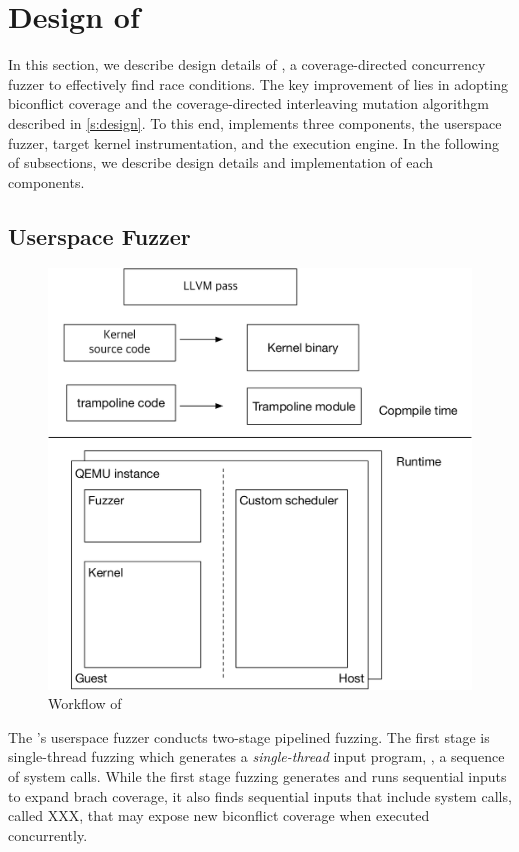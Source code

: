 \section{Design of \sys}
\label{s:impl}


In this section, we describe design details of \sys, a
coverage-directed concurrency fuzzer to effectively find race
conditions.
%
The key improvement of \sys lies in adopting biconflict coverage and
the coverage-directed interleaving mutation algorithgm described in
\autoref{s:design}.
%
To this end, \sys implements three components, the userspace fuzzer,
target kernel instrumentation, and the execution engine.
%
In the following of subsections, we describe design details and
implementation of each components.


\subsection{Userspace Fuzzer}
\label{ss:fuzzer}



\begin{figure}
  \includegraphics[width=0.9\linewidth]{fig/architecture.pdf}
  \caption{Workflow of \sys {}}
  \label{fig:workflow}
\end{figure}


The \sys's userspace fuzzer conducts two-stage pipelined fuzzing.
%
The first stage is single-thread fuzzing which generates a
\textit{single-thread} input program, \ie, a sequence of system calls.
%
While the first stage fuzzing generates and runs sequential inputs to
expand brach coverage, it also finds sequential inputs that include
system calls, called XXX, that may expose new biconflict coverage when
executed concurrently.

